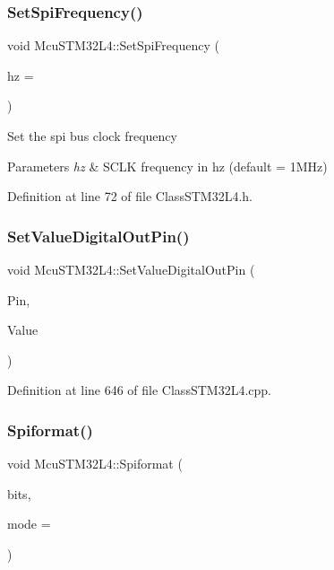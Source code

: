 \subsubsection{\texorpdfstring{Set\+Spi\+Frequency()}{SetSpiFrequency()}}
{\footnotesize\ttfamily void Mcu\+S\+T\+M32\+L4\+::\+Set\+Spi\+Frequency (\begin{DoxyParamCaption}\item[{int}]{hz = {} }\end{DoxyParamCaption})\hspace{0.3cm}{\ttfamily [inline]}}

Set the spi bus clock frequency


\begin{DoxyParams}{Parameters}
{\em hz} & S\+C\+LK frequency in hz (default = 1\+M\+Hz) \\
\hline
\end{DoxyParams}


Definition at line 72 of file Class\+S\+T\+M32\+L4.\+h.

\mbox{\label{class_mcu_s_t_m32_l4_af5c82155fbbbdccfeb5f9329990cc0f8}} 
\subsubsection{\texorpdfstring{Set\+Value\+Digital\+Out\+Pin()}{SetValueDigitalOutPin()}}
{\footnotesize\ttfamily void Mcu\+S\+T\+M32\+L4\+::\+Set\+Value\+Digital\+Out\+Pin (\begin{DoxyParamCaption}\item[{\mbox{\hyperlink{_class_s_t_m32_l0_8h_a5ceb873075d76667eb54dc6a7d2734d1}{Pin\+Name}}}]{Pin,  }\item[{int}]{Value }\end{DoxyParamCaption})}



Definition at line 646 of file Class\+S\+T\+M32\+L4.\+cpp.

\mbox{\label{class_mcu_s_t_m32_l4_ac532240fdffb1ca8bf5977527851269c}} 
\subsubsection{\texorpdfstring{Spiformat()}{Spiformat()}}
{\footnotesize\ttfamily void Mcu\+S\+T\+M32\+L4\+::\+Spiformat (\begin{DoxyParamCaption}\item[{int}]{bits,  }\item[{int}]{mode = {} }\end{DoxyParamCaption})\hspace{0.3cm}{\ttfamily [inline]}}

